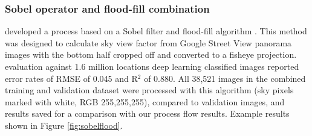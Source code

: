 \documentclass[final,3p,times,authoryear]{elsarticle}
\begin{document}
\subsubsection{Sobel operator and flood-fill combination}\label{sec:floodfill}

\cite{Middel2018} developed a process based on a Sobel filter and flood-fill algorithm \citep{Sobel1968,Laungrungthip2008,Middel2017}. This method was designed to calculate sky view factor from Google Street View panorama images with the bottom half cropped off and converted to a fisheye projection. \cite{Middel2018} evaluation against 1.6 million locations deep learning classified images reported error rates of RMSE of 0.045 and R$^{2}$ of 0.880. All 38,521 images in the combined training and validation dataset were processed with this algorithm (sky pixels marked with white, RGB 255,255,255), compared to validation images, and results saved for a comparison with our process flow results.  Example results shown in Figure \ref{fig:sobelflood}. 
\end{document}
